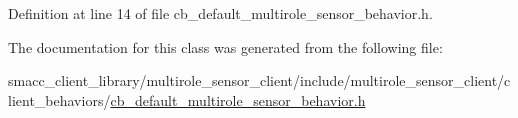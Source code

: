 Definition at line 14 of file cb\+\_\+default\+\_\+multirole\+\_\+sensor\+\_\+behavior.\+h.



The documentation for this class was generated from the following file\+:\begin{DoxyCompactItemize}
\item 
smacc\+\_\+client\+\_\+library/multirole\+\_\+sensor\+\_\+client/include/multirole\+\_\+sensor\+\_\+client/client\+\_\+behaviors/\hyperlink{cb__default__multirole__sensor__behavior_8h}{cb\+\_\+default\+\_\+multirole\+\_\+sensor\+\_\+behavior.\+h}\end{DoxyCompactItemize}
